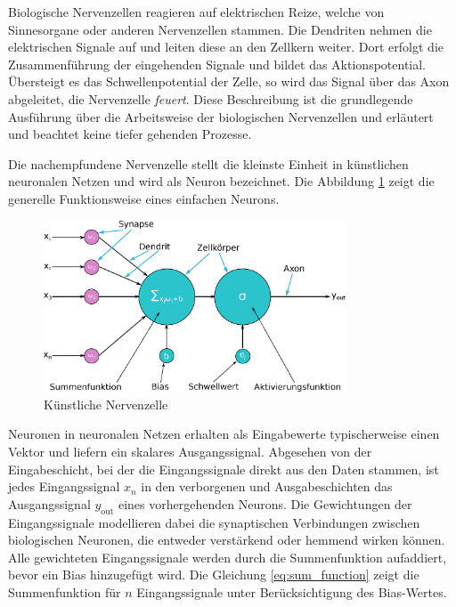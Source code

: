 Biologische Nervenzellen reagieren auf elektrischen Reize, welche von Sinnesorgane oder anderen Nervenzellen stammen. Die Dendriten nehmen die elektrischen Signale auf und leiten diese an den Zellkern weiter. Dort erfolgt die Zusammenführung der eingehenden Signale und bildet das Aktionspotential. Übersteigt es das Schwellenpotential der Zelle, so wird das Signal über das Axon abgeleitet, die Nervenzelle \glqq \textit{feuert}\grqq. Diese Beschreibung ist die grundlegende Ausführung über die Arbeitsweise der biologischen Nervenzellen und erläutert und beachtet keine tiefer gehenden Prozesse.\vspace{0.2cm}

Die nachempfundene Nervenzelle stellt die kleinste Einheit in künstlichen neuronalen Netzen und wird als Neuron bezeichnet. Die Abbildung \ref{img:artificial_neuron} zeigt die generelle Funktionsweise eines einfachen Neurons.\vspace{0.2cm}

\begin{figure}[!ht]
	\includegraphics[width=0.8\textwidth]{content/chapter_basics/images/artificial_neuron.eps}
	\centering
	\caption{Künstliche Nervenzelle}
	\label{img:artificial_neuron}
\end{figure}

Neuronen in neuronalen Netzen erhalten als Eingabewerte typischerweise einen Vektor und liefern ein skalares Ausgangssignal. Abgesehen von der Eingabeschicht, bei der die Eingangssignale direkt aus den Daten stammen, ist jedes Eingangssignal $x_n$ in den verborgenen und Ausgabeschichten das Ausgangssignal $y_{\text{out}}$ eines vorhergehenden Neurons. Die Gewichtungen der Eingangssignale modellieren dabei die synaptischen Verbindungen zwischen biologischen Neuronen, die entweder verstärkend oder hemmend wirken können. Alle gewichteten Eingangssignale werden durch die Summenfunktion aufaddiert, bevor ein Bias hinzugefügt wird. Die Gleichung \ref{eq:sum_function} zeigt die Summenfunktion für $n$ Eingangssignale unter Berücksichtigung des Bias-Wertes.\vspace{0.2cm}

